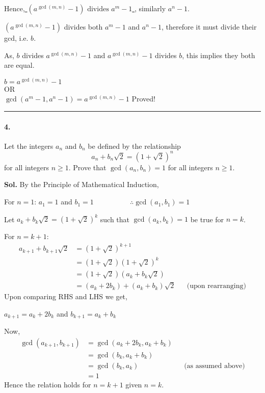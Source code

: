 \documentclass[12pt]{amsart}
\begin{document}
Hence,\underline{ $(a^{\gcd{(m,n)}} - 1) \text{ divides } a^{m}-1$ }, similarly $a^{n}-1$.

\smallskip

$(a^{\gcd{(m,n)}} - 1)$ divides both $a^{m}-1$ and $a^{n}-1$, therefore it must divide their gcd, i.e. $b$.

As, $b$ divides $a^{\gcd(m,n)}-1$ and $a^{\gcd(m,n)}-1$ divides $b$, this implies they both are equal. 

\begin{center}
    $b=a^{\gcd(m,n)}-1$ \\ OR \\
    $\gcd\left(a^{m}-1,a^{n}-1\right)=a^{\gcd(m,n)}-1$ \hspace{1.69cm} Proved!
\end{center}



\par\noindent\textcolor{gray}{\rule{\textwidth}{0.5pt}}
\smallskip

\paragraph*{4.} Let the integers $a_n$ and $b_n$ be defined by the relationship
$$a_n+b_n\sqrt{2} = (1 +\sqrt{2})^n$$
for all integers $n \ge 1$.  Prove that $\gcd{(a_n, b_n)} = 1$ for all integers $n \ge 1$.

\bigskip
\textbf{Sol.}
By the Principle of Mathematical Induction,

For $n=1$: $a_1=1$ and $b_1=1$ 
$\hspace{2cm}\therefore \gcd{(a_1, b_1)}=1$ 

Let $a_k + b_k\sqrt{2} = (1+\sqrt{2})^k$ such that $\gcd{(a_k, b_k)} = 1$ be true for $n=k$.

For $n=k+1$:
\begin{align*}
    a_{k+1} + b_{k+1}\sqrt{2} &= (1+\sqrt{2})^{k+1} \\
    &= (1+\sqrt{2})(1+\sqrt{2})^k \\
    &= (1+\sqrt{2})(a_k + b_k\sqrt{2}) \\
    &= (a_k + 2b_k) + (a_k + b_k)\sqrt{2} && \text{(upon rearranging)}
\end{align*}
Upon comparing RHS and LHS we get,
\begin{center}    
    $a_{k+1} = a_k+2b_k$ and $ b_{k+1} = a_k+b_k $
\end{center}

Now,
\begin{align*}
    \gcd{(a_{k+1}, b_{k+1})} &= \gcd{(a_k+2b_k, a_k+b_k)} \\
                             &= \gcd{(b_k, a_k+b_k)} \\
                             &= \gcd{(b_k, a_k)}  && \text{(as assumed above)} \\
                             &= 1
\end{align*}
\[\]
Hence the relation holds for $n=k+1$ given $n=k$.
\end{document}
